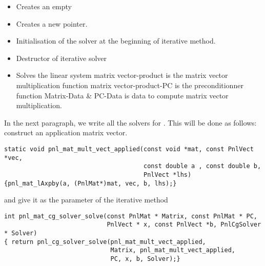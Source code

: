 \begin{itemize}
  \item {}
    \sshortdescribe Creates an empty   
\item {}
  \sshortdescribe Creates a new  pointer.  
\item {}
  \sshortdescribe Initialisation of the solver at the beginning of iterative method.  
\item {}
  \sshortdescribe Destructor of iterative solver  
\item {}
  \sshortdescribe Solves the linear system matrix vector-product is the matrix vector multiplication function matrix vector-product-PC is the preconditionner function Matrix-Data \& PC-Data is data to compute matrix vector multiplication.  
\end{itemize}


In the next paragraph, we write all the solvers for . This
will be done as follows: construct an application matrix vector.
\begin{verbatim}
static void pnl_mat_mult_vect_applied(const void *mat, const PnlVect *vec, 
                                      const double a , const double b, 
                                      PnlVect *lhs)
{pnl_mat_lAxpby(a, (PnlMat*)mat, vec, b, lhs);}
\end{verbatim}
and give it as the parameter of the iterative method
\begin{verbatim}
int pnl_mat_cg_solver_solve(const PnlMat * Matrix, const PnlMat * PC, 
                            PnlVect * x, const PnlVect *b, PnlCgSolver * Solver)
{ return pnl_cg_solver_solve(pnl_mat_mult_vect_applied, 
                             Matrix, pnl_mat_mult_vect_applied, 
                             PC, x, b, Solver);}
\end{verbatim}

